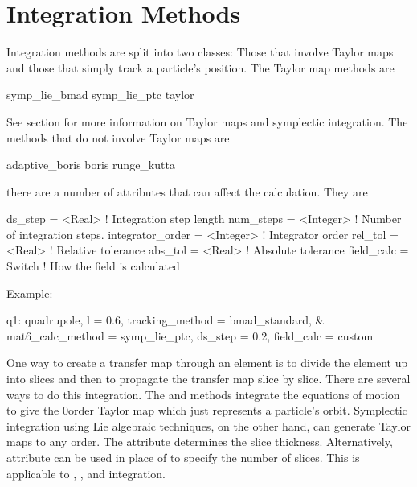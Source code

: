 \vfill \break

\section{Integration Methods}
\label{s:integ}

Integration methods are split into two classes: Those that involve
Taylor maps and those that simply track a particle's position.  The
Taylor map methods are
\begin{example}
  symp_lie_bmad
  symp_lie_ptc
  taylor
\end{example}
See section  for more information on Taylor maps
and symplectic integration.  The methods that do not involve Taylor
maps are
\begin{example}
  adaptive_boris
  boris
  runge_kutta
\end{example}

there are a number of attributes that can affect the calculation. They are
\begin{example}
  ds_step = <Real>              ! Integration step length
  num_steps = <Integer>         ! Number of integration steps.
  integrator_order = <Integer>  ! Integrator order
  rel_tol = <Real>              ! Relative tolerance
  abs_tol = <Real>              ! Absolute tolerance
  field_calc = Switch           ! How the field is calculated
\end{example}

Example:
\begin{example}
  q1: quadrupole, l = 0.6, tracking_method = bmad_standard, &
        mat6_calc_method = symp_lie_ptc, ds_step = 0.2, field_calc = custom
\end{example}

One way to create a transfer map through an element is to divide the
element up into slices and then to propagate the transfer map slice by
slice.  There are several ways to do this integration. The 
and  methods integrate the equations of motion to
give the 0\Th order Taylor map which just represents a particle's
orbit.  Symplectic integration using Lie
algebraic techniques, on the other hand, can generate Taylor maps to
any order.  The  attribute determines the slice thickness.
Alternatively,  attribute can be used in place of
 to specify the number of slices.
This is applicable to , , and
 integration.

